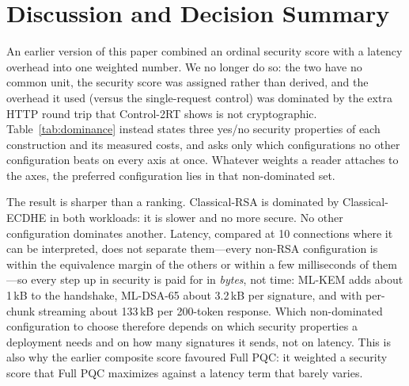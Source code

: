 \documentclass[conference]{IEEEtran}
\begin{document}
\FloatBarrier
\section{Discussion and Decision Summary}\label{sec:discussion}
An earlier version of this paper combined an ordinal security score with a latency overhead into one
weighted number. We no longer do so: the two have no common unit, the security score was assigned rather
than derived, and the overhead it used (versus the single-request control) was dominated by the extra
HTTP round trip that Control-2RT shows is not cryptographic. Table~\ref{tab:dominance} instead states three
yes/no security properties of each construction and its measured costs, and asks only which
configurations no other configuration beats on every axis at once. Whatever weights a reader attaches to
the axes, the preferred configuration lies in that non-dominated set.



The result is sharper than a ranking. Classical-RSA is dominated by Classical-ECDHE in both workloads: it
is slower and no more secure. No other configuration dominates another. Latency, compared at 10
connections where it can be interpreted, does not separate them---every non-RSA configuration is within
the equivalence margin of the others or within a few milliseconds of them---so every step up in security
is paid for in \emph{bytes}, not time:
ML-KEM adds about 1\,kB to the handshake, ML-DSA-65 about 3.2\,kB per signature, and with per-chunk
streaming about 133\,kB per 200-token response. Which non-dominated configuration to choose therefore
depends on which security properties a deployment needs and on how many signatures it sends, not on
latency. This is also why the earlier composite score favoured Full PQC: it weighted a security score
that Full PQC maximizes against a latency term that barely varies.
\end{document}
